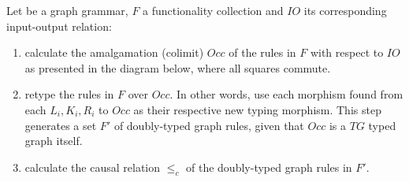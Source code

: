 \begin{definition}\label{def:ogg-construction} Let \graphGrammar{} be a graph grammar, $F$ a functionality collection and $IO$ its corresponding input-output relation:

\begin{enumerate}
  \item\label{enum:construction-colimit} calculate the amalgamation (colimit) $Occ$ of the rules in $F$ with respect to $IO$ as presented in the diagram below, where all squares commute.

\hfill\break


\item retype the rules in $F$ over $Occ$. In other words, use each morphism found from each $L_i, K_i, R_i$ to $Occ$ as their respective new typing morphism. This step generates a set $F'$ of doubly-typed graph rules, given that $Occ$ is a $TG$ typed graph itself.

\item calculate the causal relation $\leq_{c}$ of the doubly-typed graph rules in $F'$.


\end{enumerate}
\end{definition}
